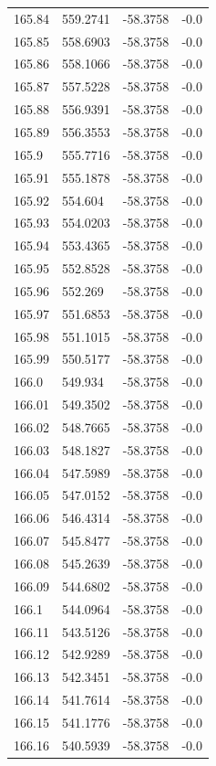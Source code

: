 \begin{table}[H]
\begin{tabular}{llll}
165.84 & 559.2741 & -58.3758 & -0.0 \\
165.85 & 558.6903 & -58.3758 & -0.0 \\
165.86 & 558.1066 & -58.3758 & -0.0 \\
165.87 & 557.5228 & -58.3758 & -0.0 \\
165.88 & 556.9391 & -58.3758 & -0.0 \\
165.89 & 556.3553 & -58.3758 & -0.0 \\
165.9 & 555.7716 & -58.3758 & -0.0 \\
165.91 & 555.1878 & -58.3758 & -0.0 \\
165.92 & 554.604 & -58.3758 & -0.0 \\
165.93 & 554.0203 & -58.3758 & -0.0 \\
165.94 & 553.4365 & -58.3758 & -0.0 \\
165.95 & 552.8528 & -58.3758 & -0.0 \\
165.96 & 552.269 & -58.3758 & -0.0 \\
165.97 & 551.6853 & -58.3758 & -0.0 \\
165.98 & 551.1015 & -58.3758 & -0.0 \\
165.99 & 550.5177 & -58.3758 & -0.0 \\
166.0 & 549.934 & -58.3758 & -0.0 \\
166.01 & 549.3502 & -58.3758 & -0.0 \\
166.02 & 548.7665 & -58.3758 & -0.0 \\
166.03 & 548.1827 & -58.3758 & -0.0 \\
166.04 & 547.5989 & -58.3758 & -0.0 \\
166.05 & 547.0152 & -58.3758 & -0.0 \\
166.06 & 546.4314 & -58.3758 & -0.0 \\
166.07 & 545.8477 & -58.3758 & -0.0 \\
166.08 & 545.2639 & -58.3758 & -0.0 \\
166.09 & 544.6802 & -58.3758 & -0.0 \\
166.1 & 544.0964 & -58.3758 & -0.0 \\
166.11 & 543.5126 & -58.3758 & -0.0 \\
166.12 & 542.9289 & -58.3758 & -0.0 \\
166.13 & 542.3451 & -58.3758 & -0.0 \\
166.14 & 541.7614 & -58.3758 & -0.0 \\
166.15 & 541.1776 & -58.3758 & -0.0 \\
166.16 & 540.5939 & -58.3758 & -0.0 \\

\end{tabular}
\end{table}
